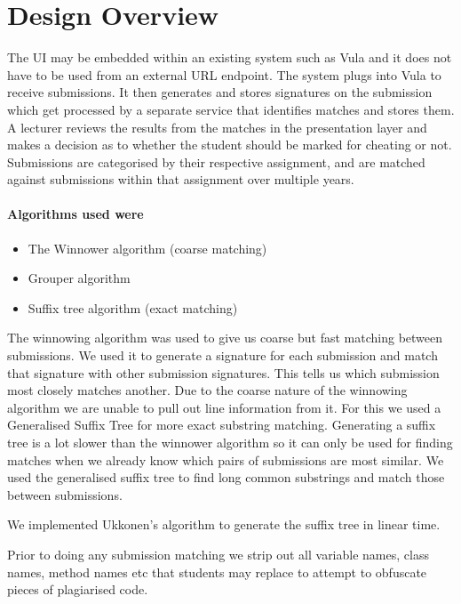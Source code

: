 \documentclass[11pt,a4paper]{article}
\begin{document}
\section{Design Overview}
\label{s:design-overview}

The UI may be embedded within an existing system such as Vula and it does not
have to be used from an external URL endpoint. The system plugs into Vula to
receive submissions. It then generates and stores signatures on the submission
which get processed by a separate service that identifies matches and stores
them. A lecturer reviews the results from the matches in the presentation layer and makes a decision as to whether the student should be marked for cheating or not. Submissions are categorised by their respective assignment, and are matched against submissions within that assignment over multiple years.

\paragraph{Algorithms used were}
\begin{itemize}
\item The Winnower algorithm (coarse matching)
\item Grouper algorithm
\item Suffix tree algorithm (exact matching)
\end{itemize}

The winnowing algorithm\cite{frohlich} was used to give us coarse but fast
matching between submissions. We used it to generate a signature for each
submission and match that signature with other submission signatures. This tells
us which submission most closely matches another. Due to the coarse nature of the winnowing algorithm we are unable to pull out line information from it. For this we used a Generalised Suffix Tree for more exact substring matching. Generating a suffix tree is a lot slower than the winnower algorithm so it can only be used for finding matches when we already know which pairs of submissions are most similar. We used the generalised suffix tree to find long common substrings and match those between submissions.

We implemented Ukkonen's algorithm to generate the suffix tree in linear time.

Prior to doing any submission matching we strip out all variable names, class
names, method names etc that students may replace to attempt to obfuscate pieces
of plagiarised code.
\end{document}
